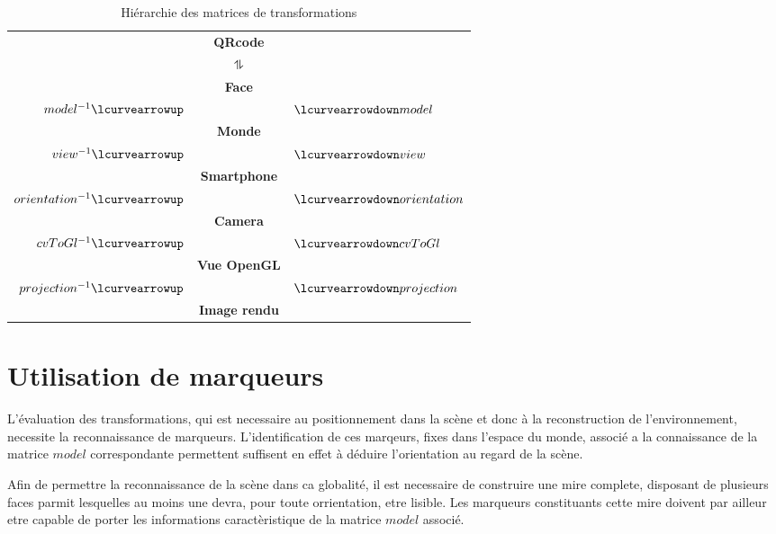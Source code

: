 \documentclass[10pt,a4paper,twoside, twocolumn]{report}
\begin{document}
\begin{table}[!ht]
	\centering
	\begin{tabular}{rcl}
																			& \textbf{QRcode}				&																\\[.2cm]
		$ $																& $\updownharpoons$			& $ $														\\[.2cm]
																			& \textbf{Face}					&																\\[.2cm]
		$model^{-1}				\lcurvearrowup$	&												& $\lcurvearrowdown model$			\\[.2cm]
																			& \textbf{Monde}				&																\\[.2cm]
		$view^{-1}				\lcurvearrowup$	& 											& $\lcurvearrowdown view$				\\[.2cm]
																			& \textbf{Smartphone}		&																\\[.2cm]
		$orientation^{-1}	\lcurvearrowup$	& 											& $\lcurvearrowdown orientation$\\[.2cm]
																			& \textbf{Camera}				&																\\[.2cm]
		$cvToGl^{-1}			\lcurvearrowup$	& 											& $\lcurvearrowdown cvToGl $		\\[.2cm]
																			& \textbf{Vue OpenGL}		&																\\[.2cm]
		$projection^{-1}	\lcurvearrowup$	&												& $\lcurvearrowdown projection$	\\[.2cm]
																			& \textbf{Image rendu}	&
	\end{tabular}
	\caption{Hiérarchie des matrices de transformations}
	\label{ref:table:hierarchie}
\end{table}



\section{Utilisation de marqueurs}

L'évaluation des transformations, qui est necessaire au positionnement dans la scène et donc à la reconstruction de l'environnement, necessite la reconnaissance de marqueurs. L'identification de ces marqeurs, fixes dans l'espace du monde, associé a la connaissance de la matrice $model$ correspondante permettent suffisent en effet à déduire l'orientation au regard de la scène.

Afin de permettre la reconnaissance de la scène dans ca globalité, il est necessaire de construire une mire complete, disposant de plusieurs faces parmit lesquelles au moins une devra, pour toute orrientation, etre lisible. Les marqueurs constituants cette mire doivent par ailleur etre capable de porter les informations caractèristique de la matrice $model$ associé.
\end{document}
